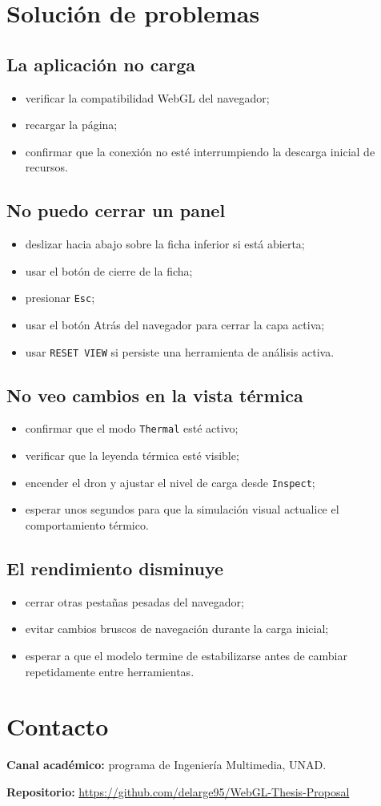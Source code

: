 \documentclass[12pt,letterpaper]{article}
\begin{document}
\section{Solución de problemas}

\subsection{La aplicación no carga}
\begin{itemize}
    \item verificar la compatibilidad WebGL del navegador;
    \item recargar la página;
    \item confirmar que la conexión no esté interrumpiendo la descarga inicial de recursos.
\end{itemize}

\subsection{No puedo cerrar un panel}
\begin{itemize}
    \item deslizar hacia abajo sobre la ficha inferior si está abierta;
    \item usar el botón de cierre de la ficha;
    \item presionar \texttt{Esc};
    \item usar el botón Atrás del navegador para cerrar la capa activa;
    \item usar \texttt{RESET VIEW} si persiste una herramienta de análisis activa.
\end{itemize}

\subsection{No veo cambios en la vista térmica}
\begin{itemize}
    \item confirmar que el modo \texttt{Thermal} esté activo;
    \item verificar que la leyenda térmica esté visible;
    \item encender el dron y ajustar el nivel de carga desde \texttt{Inspect};
    \item esperar unos segundos para que la simulación visual actualice el comportamiento térmico.
\end{itemize}

\subsection{El rendimiento disminuye}
\begin{itemize}
    \item cerrar otras pestañas pesadas del navegador;
    \item evitar cambios bruscos de navegación durante la carga inicial;
    \item esperar a que el modelo termine de estabilizarse antes de cambiar repetidamente entre herramientas.
\end{itemize}

\section{Contacto}
\textbf{Canal académico:} programa de Ingeniería Multimedia, UNAD.

\textbf{Repositorio:} \url{https://github.com/delarge95/WebGL-Thesis-Proposal}
\end{document}
